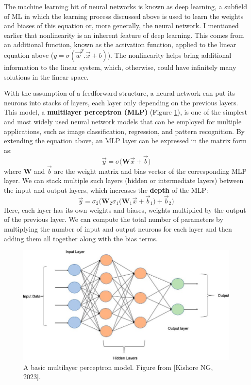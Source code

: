 The machine learning bit of neural networks is known as deep learning, a subfield of ML in which the learning process discussed above is used to learn the weights and biases of this equation or, more generally, the neural network. I mentioned earlier that nonlinearity is an inherent feature of deep learning. This comes from an additional function, known as the activation function, applied to the linear equation above ($y = \sigma(\vec{w} ^T. \vec{x} + b)$). The nonlinearity helps bring additional information to the linear system, which, otherwise, could have infinitely many solutions in the linear space.


With the assumption of a feedforward structure, a neural network can put its neurons into stacks of layers, each layer only depending on the previous layers. This model, a \textbf{multilayer perceptron (\gls{MLP})} (Figure \ref{fig:mlp}), is one of the simplest and most widely used neural network models that can be employed for multiple applications, such as image classification, regression, and pattern recognition. By extending the equation above, an MLP layer can be expressed in the matrix form as:
\begin{equation}
\vec{y} = \sigma \biggl(\mathbf{W}\vec{x} + \vec{b} \biggr)
\end{equation}
where $\mathbf{W}$ and $\vec{b}$ are the weight matrix and bias vector of the corresponding MLP layer. We can stack multiple such layers (hidden or intermediate layers) between the input and output layers, which increases the \textbf{depth} of the MLP:
\begin{equation}
\vec{y} = \sigma_2 \biggl( \mathbf{W}_2\sigma_1 \biggl(\mathbf{W}_1\vec{x} + \vec{b}_1 \biggr) + \vec{b}_2\biggr) 
\end{equation}
Here, each layer has its own weights and biases, weights multiplied by the output of the previous layer. We can compute the total number of parameters by multiplying the number of input and output neurons for each layer and then adding them all together along with the bias terms. 



\begin{figure}[ht]
  \centering
   \includegraphics[width=\linewidth]{Images/MLP.jpeg}
   \caption{A basic multilayer perceptron model. Figure from [Kishore NG, 2023].}
   \label{fig:mlp}
\end{figure}

